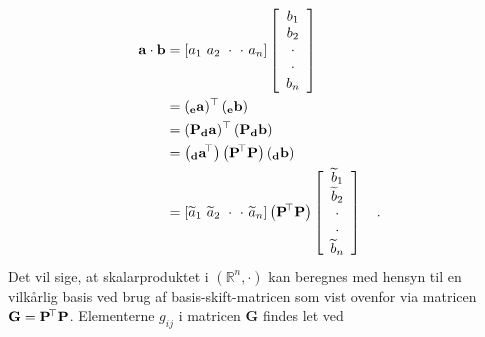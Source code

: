 \begin{equation}
\begin{aligned}
\mathbf{a}\cdot \mathbf{b} &= [a_{1} \, \, a_{2} \, \, \cdot \,\, \cdot \, \, a_{n}] \left[
                                           \begin{array}{c}
                                             b_{1} \\
                                             b_{2} \\
                                             \cdot  \\
                                             \cdot \\
                                             b_{n} \\
                                           \end{array}
                                         \right] \\
&= \left( _{\mathbf{e}}\mathbf{a}\right) \hspace*{-.6mm}^{\top} \left(_{\mathbf{e}}\mathbf{b} \right) \\
&= \left({\mathbf{P}} _{\mathbf{d}}\mathbf{a}\right) \hspace*{-.6mm}^{\top} \left({\mathbf{P}} _{\mathbf{d}}\mathbf{b} \right) \\
&= \left(_{\mathbf{d}}\mathbf{a}\hspace*{-.6mm}^{\top}\right) \left(\mathbf{P}\hspace*{-.6mm}^{\top} \mathbf{P} \right)\left(_{\mathbf{d}}\mathbf{b}\right) \\
&= [\widetilde{a}_{1} \, \, \widetilde{a}_{2} \, \, \cdot \,\, \cdot \, \, \widetilde{a}_{n}] \left(\mathbf{P}\hspace*{-.6mm}^{\top} \mathbf{P} \right) \left[
                                           \begin{array}{c}
                                             \widetilde{b}_{1} \\
                                             \widetilde{b}_{2} \\
                                             \cdot  \\
                                             \cdot \\
                                             \widetilde{b}_{n} \\
                                           \end{array}
                                         \right] \quad .
\end{aligned}
\end{equation}
Det vil sige, at skalarproduktet i $(\mathbb{R}^{n}, \cdot)$ kan beregnes med hensyn til en vilkårlig basis ved brug af basis-skift-matricen som vist ovenfor via matricen $\mathbf{G} = \mathbf{P}\hspace*{-.6mm}^{\top} \mathbf{P}$. Elementerne $g_{ij}$ i matricen $\mathbf{G}$ findes let ved
